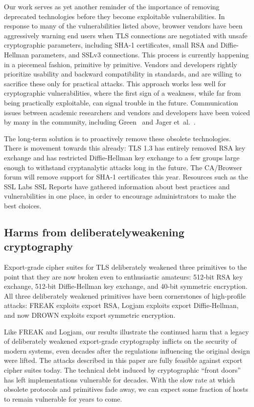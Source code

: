 Our work serves as yet another reminder of the importance of removing deprecated technologies before they become exploitable vulnerabilities.  In response to many of the vulnerabilities listed above, browser vendors have been aggressively warning end users when TLS connections are negotiated with unsafe cryptographic parameters, including SHA-1 certificates, small RSA and Diffie-Hellman parameters, and SSLv3 connections.  This process is currently happening in a piecemeal fashion, primitive by primitive.  Vendors and developers rightly prioritize usability and backward compatibility in standards, and are willing to sacrifice these only for practical attacks. This approach works less well for cryptographic vulnerabilities, where the first sign of a weakness, while far from being practically exploitable, can signal trouble in the future.
Communication issues between academic researchers and vendors and developers have been voiced by many in the community, including Green~\cite{green2015secure} and Jager et~al.\@~\cite{jager2013one}.

The long-term solution is to proactively remove these obsolete technologies.  There is movement towards this already: TLS 1.3 has entirely removed RSA key exchange and has restricted Diffie-Hellman key exchange to a few groups large enough to withstand cryptanalytic attacks long in the future.  The CA/Browser forum will remove support for SHA-1 certificates this year.
Resources such as the SSL Labs SSL Reports have gathered information about best practices and vulnerabilities
in one place, in order to encourage administrators to make
the best choices.

\subsection{Harms from \ifext deliberately\fi weakening cryptography}

Export-grade cipher suites for TLS deliberately weakened three primitives to the point that they are now broken even to enthusiastic amateurs: 512-bit RSA key exchange, 512-bit Diffie-Hellman key exchange, and 40-bit symmetric encryption.
All three deliberately weakened primitives have been cornerstones of high-profile attacks: FREAK exploits export RSA, Logjam exploits export Diffie-Hellman, and now DROWN exploits export symmetric encryption.

Like FREAK and Logjam, our results illustrate the continued harm that a legacy of deliberately weakened export-grade cryptography inflicts on the security of modern systems, even decades after the regulations influencing the original design were lifted.  The attacks described in this paper are fully feasible against export cipher suites today. The technical debt induced by cryptographic ``front doors'' has left implementations vulnerable for decades. With the slow rate at which obsolete protocols and primitives fade away, we can expect some fraction of hosts to remain vulnerable for years to come.

